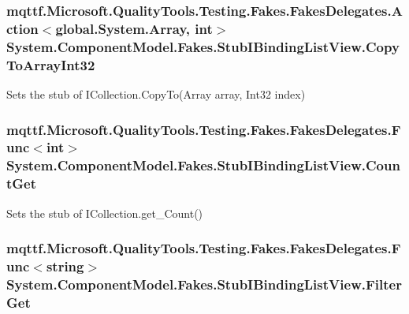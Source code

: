 \hypertarget{class_system_1_1_component_model_1_1_fakes_1_1_stub_i_binding_list_view_afe08dff83aed14754be770533b938632}{
\subsubsection[{Copy\-To\-Array\-Int32}]{\setlength{\rightskip}{0pt plus 5cm}mqttf.\-Microsoft.\-Quality\-Tools.\-Testing.\-Fakes.\-Fakes\-Delegates.\-Action$<$global.\-System.\-Array, int$>$ System.\-Component\-Model.\-Fakes.\-Stub\-I\-Binding\-List\-View.\-Copy\-To\-Array\-Int32}}\label{class_system_1_1_component_model_1_1_fakes_1_1_stub_i_binding_list_view_afe08dff83aed14754be770533b938632}


Sets the stub of I\-Collection.\-Copy\-To(\-Array array, Int32 index)

\hypertarget{class_system_1_1_component_model_1_1_fakes_1_1_stub_i_binding_list_view_a38939ae6c15af958a80e3b8dd089ecdd}{
\subsubsection[{Count\-Get}]{\setlength{\rightskip}{0pt plus 5cm}mqttf.\-Microsoft.\-Quality\-Tools.\-Testing.\-Fakes.\-Fakes\-Delegates.\-Func$<$int$>$ System.\-Component\-Model.\-Fakes.\-Stub\-I\-Binding\-List\-View.\-Count\-Get}}\label{class_system_1_1_component_model_1_1_fakes_1_1_stub_i_binding_list_view_a38939ae6c15af958a80e3b8dd089ecdd}


Sets the stub of I\-Collection.\-get\-\_\-\-Count()

\hypertarget{class_system_1_1_component_model_1_1_fakes_1_1_stub_i_binding_list_view_a892f594b673d1b3bb8032491c511c55c}{
\subsubsection[{Filter\-Get}]{\setlength{\rightskip}{0pt plus 5cm}mqttf.\-Microsoft.\-Quality\-Tools.\-Testing.\-Fakes.\-Fakes\-Delegates.\-Func$<$string$>$ System.\-Component\-Model.\-Fakes.\-Stub\-I\-Binding\-List\-View.\-Filter\-Get}}\label{class_system_1_1_component_model_1_1_fakes_1_1_stub_i_binding_list_view_a892f594b673d1b3bb8032491c511c55c}


